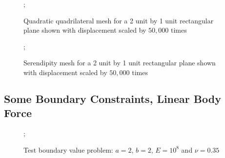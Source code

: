\documentclass{article}
\begin{document}
\begin{figure}
    ;
    \caption{Quadratic quadrilateral mesh for a 2 unit by 1 unit rectangular plane shown with displacement scaled by $50,000$ times}
\centering
\end{figure}



\begin{figure}
    ;
    \caption{Serendipity mesh for a 2 unit by 1 unit rectangular plane shown with displacement scaled by $50,000$ times}
\centering
\end{figure}


\FloatBarrier

\subsection{Some Boundary Constraints, Linear Body Force}
\FloatBarrier

\begin{figure}
    ;
    \caption{Test boundary value problem: $a = 2$, $b = 2$, $E = 10^8$ and $\nu = 0.35$}
\centering
\end{figure}
\end{document}

